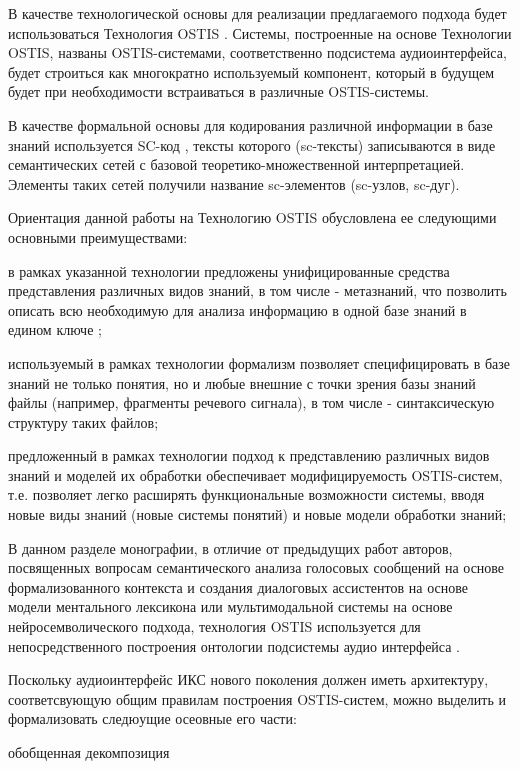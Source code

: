  В качестве технологической основы для реализации предлагаемого подхода будет использоваться Технология OSTIS . Системы, построенные на основе Технологии OSTIS, названы OSTIS-системами, соответственно подсистема аудиоинтерфейса, будет строиться как многократно используемый компонент, который в будущем будет при необходимости встраиваться в различные OSTIS-системы.

В качестве формальной основы для кодирования различной информации в базе знаний используется SC-код , тексты которого (sc-тексты) записываются в виде семантических сетей с базовой теоретико-множественной интерпретацией. Элементы таких сетей получили название sc-элементов (sc-узлов, sc-дуг).

Ориентация данной работы на Технологию OSTIS обусловлена ее следующими основными преимуществами:
\begin{textitemize}
\item в рамках указанной технологии предложены унифицированные средства представления различных видов знаний, в том числе - метазнаний, что позволить описать всю необходимую для анализа информацию в одной базе знаний в едином ключе  ;
\item используемый в рамках технологии формализм позволяет специфицировать в базе знаний не только понятия, но и любые внешние с точки зрения базы знаний файлы (например, фрагменты речевого сигнала), в том числе - синтаксическую структуру таких файлов;
\item предложенный в рамках технологии подход к представлению различных видов знаний   и моделей их обработки  обеспечивает модифицируемость OSTIS-систем, т.е. позволяет легко расширять функциональные возможности системы, вводя новые виды знаний (новые системы понятий) и новые модели обработки знаний;
\end{textitemize}

В данном разделе монографии, в отличие от предыдущих работ авторов, посвященных вопросам семантического анализа голосовых сообщений на основе формализованного контекста и создания диалоговых ассистентов на основе модели ментального лексикона или мультимодальной системы на основе нейросемволического подхода, технология OSTIS используется для непосредственного построения онтологии подсистемы аудио интерфейса .

Поскольку аудиоинтерфейс ИКС нового поколения должен иметь архитектуру, соответсвующую общим правилам построения OSTIS-систем, можно выделить и формализовать следюущие осеовные его части: 
\begin{SCn}
	\begin{scnrelfromset}{обобщенная декомпозиция}
	\end{scnrelfromset}
\end{SCn}

